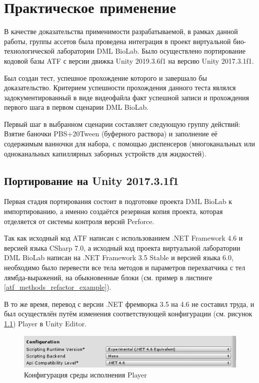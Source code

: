 \chapter{Практическое применение}
В качестве доказательства применимости разрабатываемой, в рамках данной работы, группы ассетов была проведена интеграция в проект виртуальной био-технологической лаборатории DML BioLab. Было осуществлено портирование кодовой базы ATF с версии движка Unity 2019.3.6f1 на версию Unity 2017.3.1f1. 

Был создан тест, успешное прохождение которого и завершало бы доказательство. Критерием успешности прохождения данного теста являлся задокументированный в виде видеофайла факт успешной записи и прохождения первого шага в первом сценарии DML BioLab.

Первый шаг в выбранном сценарии составляет следующую группу действий: Взятие баночки PBS+20Tween (буферного раствора) и заполнение её содержимым ванночки для набора, с помощью диспенсеров (многоканальных или одноканальных капиллярных заборных устройств для жидкостей). 

\section{Портирование на Unity 2017.3.1f1}
Первая стадия портирования состоит в подготовке проекта DML BioLab к импортированию, а именно создаётся резервная копия проекта, которая отделяется от системы контроля версий  Perforce.

Так как исходный код ATF написан с использованием .NET Framework 4.6 и версией языка CSharp 7.0, а исходный код проекта виртуальной лаборатории DML BioLab написан на .NET Framework 3.5 Stable и версией языка 6.0, необходимо было перевести все тела методов и параметров перехватчика с тел лямбда-выражений, на обыкновенные блоки (см. пример в листинге \ref{atf_methods_refactor_example}).

В то же время, перевод с версии .NET фремворка 3.5 на 4.6 не составил труда, и был осуществлён путём изменения соответствующей конфигурации (см. рисунок \ref{player_conf}) Player в Unity Editor.

\begin{figure}[H]
	\centering
	\includegraphics[width=\linewidth]{player_config.png}
	\caption{Конфигурация среды исполнения Player}
	\label{player_conf}
\end{figure}

